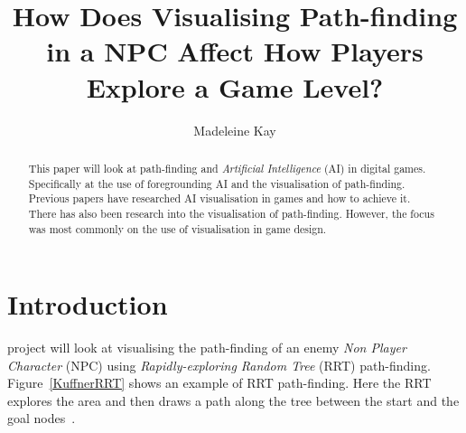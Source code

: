 \documentclass[journal]{IEEEtran}
\begin{document}
%
\title{ How Does Visualising Path-finding in a NPC Affect How Players Explore a Game Level?}
%
%
\author{Madeleine Kay}


\maketitle

\begin{abstract}
This paper will look at path-finding and \textit{Artificial Intelligence} (AI) in digital games.   Specifically at the use of foregrounding AI and the visualisation of path-finding. 
Previous papers have researched AI visualisation in games and how to achieve it. There has also been research into the visualisation of path-finding. However, the focus was most commonly on the use of visualisation in game design.
\end{abstract}

\section{Introduction} \label{introduction}
% 
% 
% 
% 
 project will look at visualising the path-finding of an enemy \textit{Non Player Character} (NPC) using \textit{Rapidly-exploring Random Tree} (RRT) path-finding.  Figure~\ref{KuffnerRRT} shows an example of RRT path-finding. Here the RRT explores the area and then draws a path along the tree between the start and the goal nodes~\cite{Kuffner2000}. 
\end{document}
